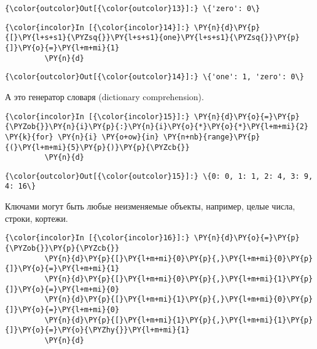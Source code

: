             \begin{Verbatim}[commandchars=\\\{\}]
{\color{outcolor}Out[{\color{outcolor}13}]:} \{'zero': 0\}
\end{Verbatim}
        
    \begin{Verbatim}[commandchars=\\\{\}]
{\color{incolor}In [{\color{incolor}14}]:} \PY{n}{d}\PY{p}{[}\PY{l+s+s1}{\PYZsq{}}\PY{l+s+s1}{one}\PY{l+s+s1}{\PYZsq{}}\PY{p}{]}\PY{o}{=}\PY{l+m+mi}{1}
         \PY{n}{d}
\end{Verbatim}

            \begin{Verbatim}[commandchars=\\\{\}]
{\color{outcolor}Out[{\color{outcolor}14}]:} \{'one': 1, 'zero': 0\}
\end{Verbatim}
        
    А это генератор словаря (dictionary comprehension).

    \begin{Verbatim}[commandchars=\\\{\}]
{\color{incolor}In [{\color{incolor}15}]:} \PY{n}{d}\PY{o}{=}\PY{p}{\PYZob{}}\PY{n}{i}\PY{p}{:}\PY{n}{i}\PY{o}{*}\PY{o}{*}\PY{l+m+mi}{2} \PY{k}{for} \PY{n}{i} \PY{o+ow}{in} \PY{n+nb}{range}\PY{p}{(}\PY{l+m+mi}{5}\PY{p}{)}\PY{p}{\PYZcb{}}
         \PY{n}{d}
\end{Verbatim}

            \begin{Verbatim}[commandchars=\\\{\}]
{\color{outcolor}Out[{\color{outcolor}15}]:} \{0: 0, 1: 1, 2: 4, 3: 9, 4: 16\}
\end{Verbatim}
        
    Ключами могут быть любые неизменяемые объекты, например, целые числа,
строки, кортежи.

    \begin{Verbatim}[commandchars=\\\{\}]
{\color{incolor}In [{\color{incolor}16}]:} \PY{n}{d}\PY{o}{=}\PY{p}{\PYZob{}}\PY{p}{\PYZcb{}}
         \PY{n}{d}\PY{p}{[}\PY{l+m+mi}{0}\PY{p}{,}\PY{l+m+mi}{0}\PY{p}{]}\PY{o}{=}\PY{l+m+mi}{1}
         \PY{n}{d}\PY{p}{[}\PY{l+m+mi}{0}\PY{p}{,}\PY{l+m+mi}{1}\PY{p}{]}\PY{o}{=}\PY{l+m+mi}{0}
         \PY{n}{d}\PY{p}{[}\PY{l+m+mi}{1}\PY{p}{,}\PY{l+m+mi}{0}\PY{p}{]}\PY{o}{=}\PY{l+m+mi}{0}
         \PY{n}{d}\PY{p}{[}\PY{l+m+mi}{1}\PY{p}{,}\PY{l+m+mi}{1}\PY{p}{]}\PY{o}{=}\PY{o}{\PYZhy{}}\PY{l+m+mi}{1}
         \PY{n}{d}
\end{Verbatim}

